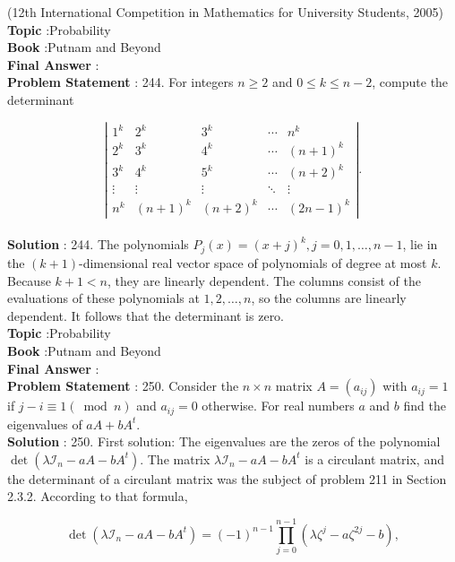 \documentclass[10pt]{article}
\begin{document}
(12th International Competition in Mathematics for University Students, 2005)
\\
\textbf{Topic} :Probability\\
\textbf{Book} :Putnam and Beyond\\
\textbf{Final Answer} :\\


\textbf{Problem Statement} :
244. For integers $n \geq 2$ and $0 \leq k \leq n-2$, compute the determinant

$$
\left|\begin{array}{ccccc}
1^{k} & 2^{k} & 3^{k} & \cdots & n^{k} \\
2^{k} & 3^{k} & 4^{k} & \cdots & (n+1)^{k} \\
3^{k} & 4^{k} & 5^{k} & \cdots & (n+2)^{k} \\
\vdots & \vdots & \vdots & \ddots & \vdots \\
n^{k} & (n+1)^{k} & (n+2)^{k} & \cdots & (2 n-1)^{k}
\end{array}\right| .
$$
\\
\textbf{Solution} :
244. The polynomials $P_{j}(x)=(x+j)^{k}, j=0,1, \ldots, n-1$, lie in the $(k+1)$-dimensional real vector space of polynomials of degree at most $k$. Because $k+1<n$, they are linearly dependent. The columns consist of the evaluations of these polynomials at $1,2, \ldots, n$, so the columns are linearly dependent. It follows that the determinant is zero.
\\
\textbf{Topic} :Probability\\
\textbf{Book} :Putnam and Beyond\\
\textbf{Final Answer} :\\


\textbf{Problem Statement} :
250. Consider the $n \times n$ matrix $A=\left(a_{i j}\right)$ with $a_{i j}=1$ if $j-i \equiv 1(\bmod n)$ and $a_{i j}=0$ otherwise. For real numbers $a$ and $b$ find the eigenvalues of $a A+b A^{t}$.
\\
\textbf{Solution} :
250. First solution: The eigenvalues are the zeros of the polynomial $\operatorname{det}\left(\lambda \mathcal{I}_{n}-a A-b A^{t}\right)$. The matrix $\lambda \mathcal{I}_{n}-a A-b A^{t}$ is a circulant matrix, and the determinant of a circulant matrix was the subject of problem 211 in Section 2.3.2. According to that formula,

$$
\operatorname{det}\left(\lambda \mathcal{I}_{n}-a A-b A^{t}\right)=(-1)^{n-1} \prod_{j=0}^{n-1}\left(\lambda \zeta^{j}-a \zeta^{2 j}-b\right),
$$
\end{document}
